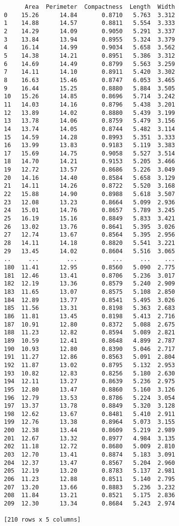 \documentclass[11pt]{article}
\begin{document}
    
    \begin{verbatim}
      Area  Perimeter  Compactness  Length  Width
0    15.26      14.84       0.8710   5.763  3.312
1    14.88      14.57       0.8811   5.554  3.333
2    14.29      14.09       0.9050   5.291  3.337
3    13.84      13.94       0.8955   5.324  3.379
4    16.14      14.99       0.9034   5.658  3.562
5    14.38      14.21       0.8951   5.386  3.312
6    14.69      14.49       0.8799   5.563  3.259
7    14.11      14.10       0.8911   5.420  3.302
8    16.63      15.46       0.8747   6.053  3.465
9    16.44      15.25       0.8880   5.884  3.505
10   15.26      14.85       0.8696   5.714  3.242
11   14.03      14.16       0.8796   5.438  3.201
12   13.89      14.02       0.8880   5.439  3.199
13   13.78      14.06       0.8759   5.479  3.156
14   13.74      14.05       0.8744   5.482  3.114
15   14.59      14.28       0.8993   5.351  3.333
16   13.99      13.83       0.9183   5.119  3.383
17   15.69      14.75       0.9058   5.527  3.514
18   14.70      14.21       0.9153   5.205  3.466
19   12.72      13.57       0.8686   5.226  3.049
20   14.16      14.40       0.8584   5.658  3.129
21   14.11      14.26       0.8722   5.520  3.168
22   15.88      14.90       0.8988   5.618  3.507
23   12.08      13.23       0.8664   5.099  2.936
24   15.01      14.76       0.8657   5.789  3.245
25   16.19      15.16       0.8849   5.833  3.421
26   13.02      13.76       0.8641   5.395  3.026
27   12.74      13.67       0.8564   5.395  2.956
28   14.11      14.18       0.8820   5.541  3.221
29   13.45      14.02       0.8604   5.516  3.065
..     ...        ...          ...     ...    ...
180  11.41      12.95       0.8560   5.090  2.775
181  12.46      13.41       0.8706   5.236  3.017
182  12.19      13.36       0.8579   5.240  2.909
183  11.65      13.07       0.8575   5.108  2.850
184  12.89      13.77       0.8541   5.495  3.026
185  11.56      13.31       0.8198   5.363  2.683
186  11.81      13.45       0.8198   5.413  2.716
187  10.91      12.80       0.8372   5.088  2.675
188  11.23      12.82       0.8594   5.089  2.821
189  10.59      12.41       0.8648   4.899  2.787
190  10.93      12.80       0.8390   5.046  2.717
191  11.27      12.86       0.8563   5.091  2.804
192  11.87      13.02       0.8795   5.132  2.953
193  10.82      12.83       0.8256   5.180  2.630
194  12.11      13.27       0.8639   5.236  2.975
195  12.80      13.47       0.8860   5.160  3.126
196  12.79      13.53       0.8786   5.224  3.054
197  13.37      13.78       0.8849   5.320  3.128
198  12.62      13.67       0.8481   5.410  2.911
199  12.76      13.38       0.8964   5.073  3.155
200  12.38      13.44       0.8609   5.219  2.989
201  12.67      13.32       0.8977   4.984  3.135
202  11.18      12.72       0.8680   5.009  2.810
203  12.70      13.41       0.8874   5.183  3.091
204  12.37      13.47       0.8567   5.204  2.960
205  12.19      13.20       0.8783   5.137  2.981
206  11.23      12.88       0.8511   5.140  2.795
207  13.20      13.66       0.8883   5.236  3.232
208  11.84      13.21       0.8521   5.175  2.836
209  12.30      13.34       0.8684   5.243  2.974

[210 rows x 5 columns]
    \end{verbatim}
\end{document}
